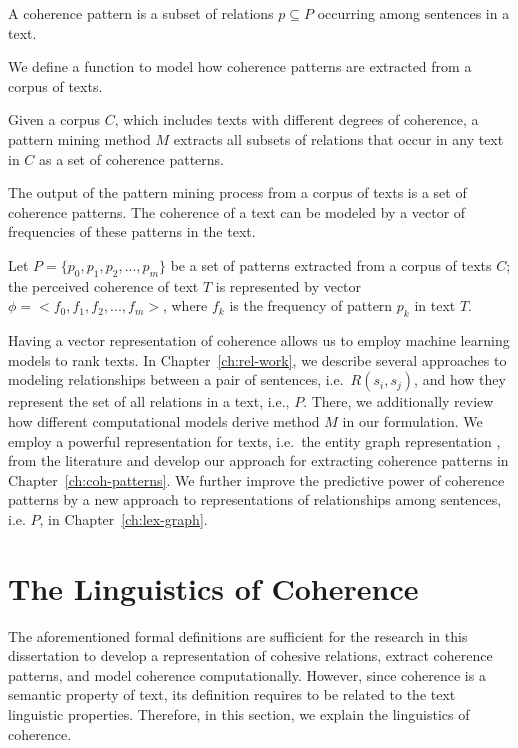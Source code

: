 \begin{definition}
\label{def:def-coh-pattern}
A coherence pattern is a subset of relations $p \subseteq P$ occurring among sentences in a text.   
\end{definition}

We define a function to model how coherence patterns are extracted from a corpus of texts. 

\begin{definition}
Given a corpus $C$, which includes texts with different degrees of coherence, a pattern mining method $M$ extracts all subsets of relations that occur in any text in $C$ as a set of coherence patterns. 
\end{definition} 

The output of the pattern mining process from a corpus of texts is a set of coherence patterns. 
The coherence of a text can be modeled by a vector of frequencies of these patterns in the text. 

\begin{definition}
Let $P=\lbrace p_0,p_1,p_2,...,p_m \rbrace$ be a set of patterns extracted from a corpus of texts $C$; the perceived coherence of text $T$ is represented by  vector $\phi = <f_0, f_1, f_2,...,f_m>$, where $f_k$ is the frequency of pattern $p_k$ in text $T$. 
\end{definition}

Having a vector representation of coherence allows us to employ machine learning models to rank texts. 
In Chapter~\ref{ch:rel-work}, we describe several approaches to modeling relationships between a pair of sentences, i.e.\ $R(s_i,s_j)$, and how they represent the set of all relations in a text, i.e., $P$.  
There, we additionally review how different computational models derive method $M$ in our formulation.  
We employ a powerful representation for texts, i.e.\ the entity graph representation \cite{guinaudeau13}, from the literature and develop our approach for extracting coherence patterns in Chapter~\ref{ch:coh-patterns}. 
We further improve the predictive power of coherence patterns by a new approach to representations of relationships among sentences, i.e. $P$, in Chapter~\ref{ch:lex-graph}. 

\section{The Linguistics of Coherence}
\label{sec:coh-linguistics}

The aforementioned formal definitions are sufficient for the research in this dissertation to develop a representation of cohesive relations, extract coherence patterns, and model coherence computationally.  
However, since coherence is a semantic property of text, its definition requires to be related to the text linguistic properties.   
Therefore, in this section, we explain the linguistics of coherence. 

